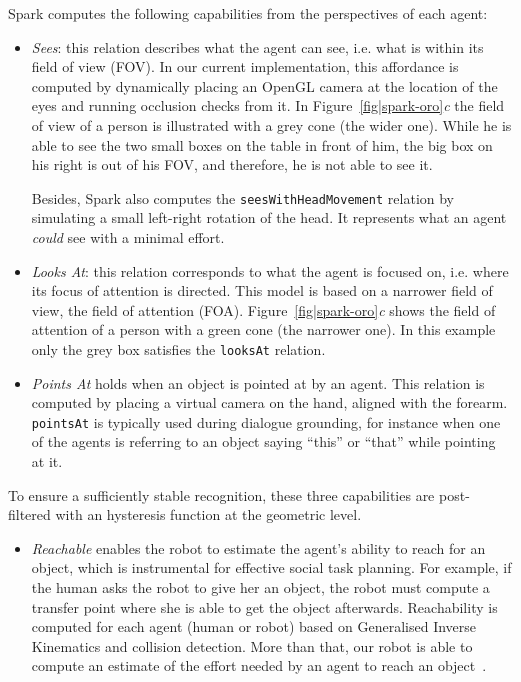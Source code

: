 \documentclass[preprint,3p,times]{elsarticle}
\newcommand{\concept}[1]{{\small \texttt{#1}}}
\newcommand{\ie}{i.e.\xspace}
\begin{document}
{\sc Spark} computes the following capabilities from the perspectives of each agent:

\begin{itemize}

\item \emph{Sees}: this relation describes what the agent can see, \ie what is
    within its field of view (FOV). In our current implementation, this
    affordance is computed by dynamically placing an OpenGL camera at the
    location of the eyes and running occlusion checks from it.  In
    Figure~\ref{fig|spark-oro}\emph{c} the field of view of a person is
    illustrated with a grey cone (the wider one). While he is able to see the two
    small boxes on the table in front of him, the big box on his right is out of
    his FOV, and therefore, he is not able to see it. 

    Besides, {\sc Spark} also computes the \concept{seesWithHeadMovement}
    relation by simulating a small left-right rotation of the head. It
    represents what an agent \emph{could} see with a minimal effort.
    

\item \emph{Looks At}: this relation corresponds to what the agent is focused
    on, \ie where its focus of attention is directed. This model is based on a
    narrower field of view, the field of attention (FOA).
    Figure~\ref{fig|spark-oro}\emph{c} shows the field of attention
    of a person with a green cone (the narrower one). In this example only the grey
    box satisfies the \concept{looksAt} relation.


\item \emph{Points At} holds when an object is pointed at by an agent.
    This relation is computed by placing a virtual camera on the hand, aligned
    with the forearm. \concept{pointsAt} is typically used during dialogue
    grounding, for instance when one of the agents is referring to an object
    saying ``this'' or ``that'' while pointing at it.
\end{itemize}

To ensure a sufficiently stable recognition, these three capabilities are post-filtered
with an hysteresis function at the geometric level.

\begin{itemize}
\item \emph{Reachable} enables the robot to estimate the agent's ability to
    reach for an object, which is instrumental for effective social task
    planning. For example, if the human asks the robot to give her an object,
    the robot must compute a transfer point where she is able to get the
    object afterwards.  Reachability is computed for each agent (human or robot) based on
    Generalised Inverse Kinematics and collision detection. More than that, our robot is able 
    to compute an estimate of the effort needed by an agent to reach an object~\cite{pandey2013affordance}.

\end{itemize}
\end{document}
